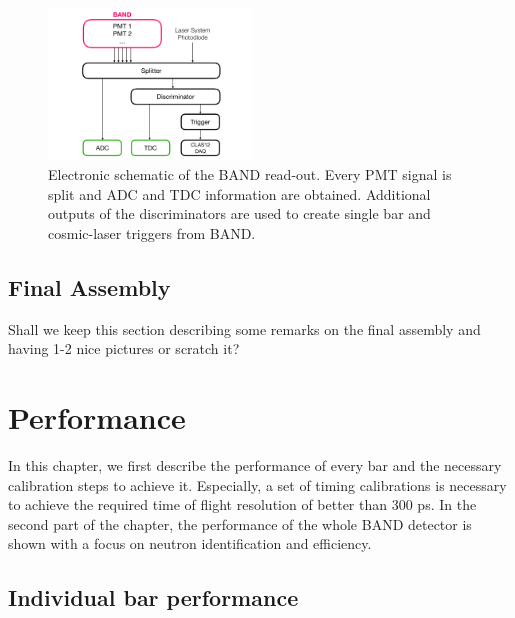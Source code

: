 \documentclass[3p,final,twocolumn]{elsarticle}
\begin{document}
\begin{figure}[th!]
	\centering
		\includegraphics[width=0.48\textwidth]{figures/electronics-diag.pdf}
	\caption{Electronic schematic of the BAND read-out. Every PMT signal is split and ADC and TDC information are obtained. Additional outputs of the discriminators are used to create single bar and cosmic-laser triggers from BAND.}
	\label{fig:electronic-diag}
\end{figure}


\subsection{Final Assembly}
{\color{red} Shall we keep this section describing some remarks on the final assembly and having 1-2 nice pictures or scratch it?}


\section{Performance}
In this chapter, we first describe the performance of every bar and the necessary calibration steps to achieve it. Especially, a set of timing calibrations is necessary to achieve the required time of flight resolution of better than 300 \si{\pico\s}.
In the second part of the chapter, the performance of the whole BAND detector is shown with a focus on neutron identification and efficiency.
\subsection{Individual bar performance}
\end{document}
